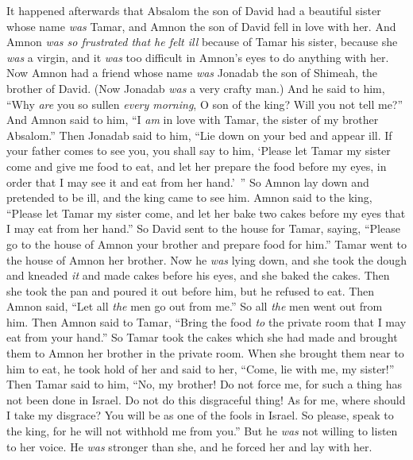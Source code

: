 \begin{biblechapter} %
 It happened afterwards that Absalom the son of David had a beautiful sister whose name \textit{was} Tamar, and Amnon the son of David fell in love with her.
\verse And Amnon \textit{was so frustrated that he felt ill} because of Tamar his sister, because she \textit{was} a virgin, and it \textit{was} too difficult in Amnon’s eyes to do anything with her.
\verse Now Amnon had a friend whose name \textit{was} Jonadab the son of Shimeah, the brother of David. (Now Jonadab \textit{was} a very crafty man.)
\verse And he said to him, “Why \textit{are} you so sullen \textit{every morning}, O son of the king? Will you not tell me?” And Amnon said to him, “I \textit{am} in love with Tamar, the sister of my brother Absalom.”
\verse Then Jonadab said to him, “Lie down on your bed and appear ill. If your father comes to see you, you shall say to him, ‘Please let Tamar my sister come and give me food to eat, and let her prepare the food before my eyes, in order that I may see it and eat from her hand.’ ”
\verse So Amnon lay down and pretended to be ill, and the king came to see him. Amnon said to the king, “Please let Tamar my sister come, and let her bake two cakes before my eyes that I may eat from her hand.”
\verse So David sent to the house for Tamar, saying, “Please go to the house of Amnon your brother and prepare food for him.”
\verse Tamar went to the house of Amnon her brother. Now he \textit{was} lying down, and she took the dough and kneaded \textit{it} and made cakes before his eyes, and she baked the cakes.
\verse Then she took the pan and poured it out before him, but he refused to eat. Then Amnon said, “Let all \textit{the} men go out from me.” So all \textit{the} men went out from him.
\verse Then Amnon said to Tamar, “Bring the food \textit{to} the private room that I may eat from your hand.” So Tamar took the cakes which she had made and brought them to Amnon her brother in the private room.
\verse When she brought them near to him to eat, he took hold of her and said to her, “Come, lie with me, my sister!”
\verse Then Tamar said to him, “No, my brother! Do not force me, for such a thing has not been done in Israel. Do not do this disgraceful thing!
\verse As for me, where should I take my disgrace? You will be as one of the fools in Israel. So please, speak to the king, for he will not withhold me from you.”
\verse But he \textit{was} not willing to listen to her voice. He \textit{was} stronger than she, and he forced her and lay with her.

\end{biblechapter}
